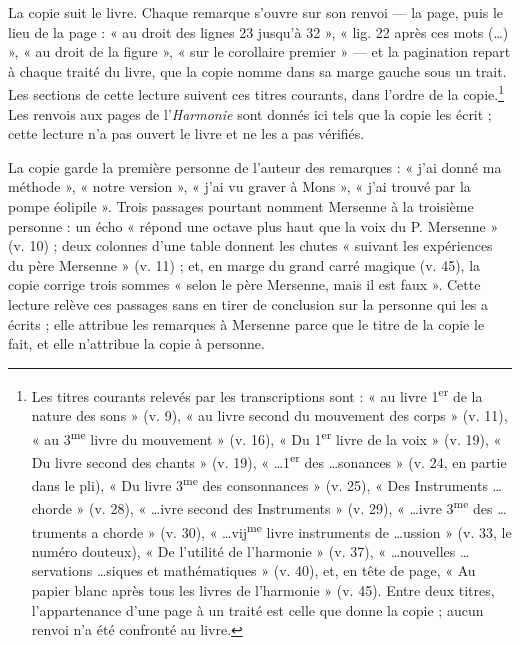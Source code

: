 \documentclass[11pt,a4paper]{article}
\begin{document}
La copie suit le livre. Chaque remarque s'ouvre sur son renvoi — la page, puis
le lieu de la page : « au droit des lignes 23 jusqu'à 32 », « lig. 22 après ces
mots (\dots) », « au droit de la figure », « sur le corollaire premier » — et la
pagination repart à chaque traité du livre, que la copie nomme dans sa marge
gauche sous un trait. Les sections de cette lecture suivent ces titres
courants, dans l'ordre de la copie.\footnote{Les titres courants relevés par les
transcriptions sont : « au livre 1\textsuperscript{er} de la nature des sons »
(v. 9), « au livre second du mouvement des corps » (v. 11), « au
3\textsuperscript{me} livre du mouvement » (v. 16), « Du 1\textsuperscript{er}
livre de la voix » (v. 19), « Du livre second des chants » (v. 19),
« \dots 1\textsuperscript{er} des \dots sonances » (v. 24, en partie dans le pli),
« Du livre 3\textsuperscript{me} des consonnances » (v. 25), « Des Instruments
\dots chorde » (v. 28), « \dots ivre second des Instruments » (v. 29),
« \dots ivre 3\textsuperscript{me} des \dots truments a chorde » (v. 30),
« \dots vij\textsuperscript{me} livre instruments de \dots ussion » (v. 33, le
numéro douteux), « De l'utilité de l'harmonie » (v. 37), « \dots nouvelles
\dots servations \dots siques et mathématiques » (v. 40), et, en tête de page,
« Au papier blanc après tous les livres de l'harmonie » (v. 45). Entre deux
titres, l'appartenance d'une page à un traité est celle que donne la copie ;
aucun renvoi n'a été confronté au livre.} Les renvois aux pages de
l'\emph{Harmonie} sont donnés ici tels que la copie les écrit ; cette lecture
n'a pas ouvert le livre et ne les a pas vérifiés.

La copie garde la première personne de l'auteur des remarques : « j'ai donné ma
méthode », « notre version », « j'ai vu graver à Mons », « j'ai trouvé par la
pompe éolipile ». Trois passages pourtant nomment Mersenne à la troisième
personne : un écho « répond une octave plus haut que la voix du P. Mersenne »
(v. 10) ; deux colonnes d'une table donnent les chutes « suivant les
expériences du père Mersenne » (v. 11) ; et, en marge du grand carré magique
(v. 45), la copie corrige trois sommes « selon le père Mersenne, mais il est
faux ». Cette lecture relève ces passages sans en tirer de conclusion sur la
personne qui les a écrits ; elle attribue les remarques à Mersenne parce que
le titre de la copie le fait, et elle n'attribue la copie à personne.
\end{document}
